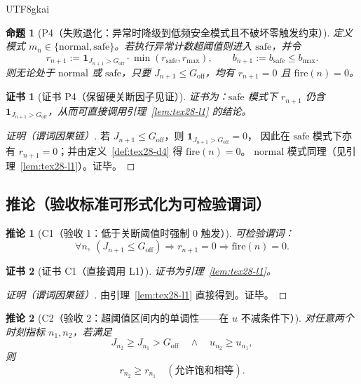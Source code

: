 \documentclass[12pt]{article}
\newtheorem{proposition}{命题}[section]
\newtheorem{corollary}{推论}[section]
\newtheorem{Certificate}{证书}[section]
\newcommand{\indicator}[1]{\mathbf{1}_{#1}}
\begin{document}
\begin{CJK*}{UTF8}{gkai}
\begin{proposition}[P4（失败退化：异常时降级到低频安全模式且不破坏零触发约束）]
\label{prop:tex28-p4}
定义模式 $m_n\in\{\mathrm{normal},\mathrm{safe}\}$。若执行异常计数超阈值则进入 $\mathrm{safe}$，并令
\[
  r_{n+1} := \indicator{J_{n+1}>G_{\mathrm{off}}}\cdot \min(r_{\mathrm{safe}},r_{\max}),
  \qquad
  b_{n+1} := b_{\mathrm{safe}}\le b_{\max}.
\]
则无论处于 $\mathrm{normal}$ 或 $\mathrm{safe}$，只要 $J_{n+1}\le G_{\mathrm{off}}$，均有 $r_{n+1}=0$ 且 $\mathrm{fire}(n)=0$。
\end{proposition}

\begin{Certificate}[证书 P4（保留硬关断因子见证）]
\label{cert:tex28-p4}
证书为：$\mathrm{safe}$ 模式下 $r_{n+1}$ 仍含 $\indicator{J_{n+1}>G_{\mathrm{off}}}$，从而可直接调用引理~\ref{lem:tex28-l1} 的结论。
\end{Certificate}

\begin{proof}[证明（谓词因果链）]
若 $J_{n+1}\le G_{\mathrm{off}}$，则 $\indicator{J_{n+1}>G_{\mathrm{off}}}=0$，
因此在 $\mathrm{safe}$ 模式下亦有 $r_{n+1}=0$；并由定义~\ref{def:tex28-d4} 得 $\mathrm{fire}(n)=0$。
$\mathrm{normal}$ 模式同理（见引理~\ref{lem:tex28-l1}）。证毕。
\end{proof}

\subsection{推论（验收标准可形式化为可检验谓词）}
\label{subsec:tex28-corollaries}

\begin{corollary}[C1（验收 1：低于关断阈值时强制 0 触发）]
\label{cor:tex28-c1}
可检验谓词：
\[
  \forall n,\ (J_{n+1}\le G_{\mathrm{off}})\Rightarrow r_{n+1}=0\Rightarrow \mathrm{fire}(n)=0.
\]
\end{corollary}

\begin{Certificate}[证书 C1（直接调用 L1）]
\label{cert:tex28-c1}
证书为引理~\ref{lem:tex28-l1}。
\end{Certificate}

\begin{proof}[证明（谓词因果链）]
由引理~\ref{lem:tex28-l1} 直接得到。证毕。
\end{proof}

\begin{corollary}[C2（验收 2：超阈值区间内的单调性——在 $u$ 不减条件下）]
\label{cor:tex28-c2}
对任意两个时刻指标 $n_1,n_2$，若满足
\[
  J_{n_2}\ge J_{n_1}>G_{\mathrm{off}}
  \quad\wedge\quad
  u_{n_2}\ge u_{n_1},
\]
则
\[
  r_{n_2}\ge r_{n_1}
  \quad(\text{允许饱和相等}).
\]
\end{corollary}


\end{CJK*}
\end{document}
